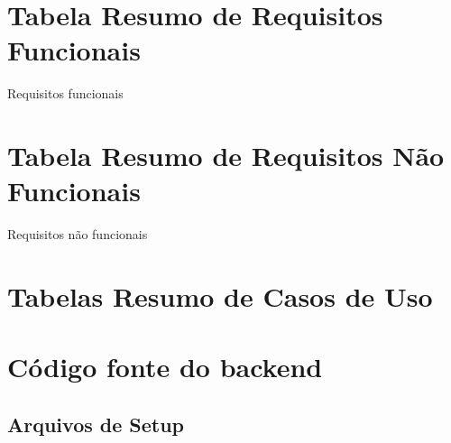 \chapter{Tabela Resumo de Requisitos Funcionais}
   \begin{table}[H]
        \centering
        \caption{Requisitos funcionais}
        \label{tab:reqFunc}
        \PrintRequisitosFunc
    \end{table}

\chapter{Tabela Resumo de Requisitos Não Funcionais}
   \begin{table}[H]
        \centering
        \caption{Requisitos não funcionais}
        \label{tab:reqNFunc}
        \PrintRequisitosNFunc
    \end{table}
    
\chapter{Tabelas Resumo de Casos de Uso}


\chapter{Código fonte do backend}\label{anexo:sources}
\let\svaddcontentsline\addcontentsline
\renewcommand\addcontentsline[3]{%
  \ifthenelse{\equal{#1}{lol}}{}%
  {\svaddcontentsline{#1}{#2}{#3}}}
%
\section{Arquivos de Setup}








